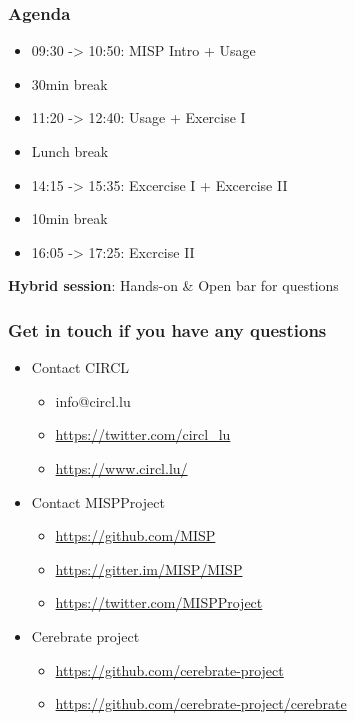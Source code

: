 
\begin{frame}
\titlepage
\end{frame}

\begin{frame}
\frametitle{Agenda}
    \begin{itemize}
        \item 09:30 -> 10:50: MISP Intro + Usage %
        \item 30min break
        \item 11:20 -> 12:40: Usage + Exercise I %
        \item Lunch break
        \item 14:15 -> 15:35: Excercise I + Excercise II %
        \item 10min break
        \item 16:05 -> 17:25: Excrcise II %
    \end{itemize}
    \vspace{0.5cm}
    \textbf{Hybrid session}: Hands-on \& Open bar for questions
\end{frame}

\begin{frame}
  \frametitle{Get in touch if you have any questions}
  \begin{itemize}
    \item Contact CIRCL
    \begin{itemize}
      \item info@circl.lu
      \item \url{https://twitter.com/circl_lu}
      \item \url{https://www.circl.lu/}
    \end{itemize}
    \item Contact MISPProject 
    \begin{itemize}
      \item \url{https://github.com/MISP}
      \item \url{https://gitter.im/MISP/MISP}
      \item \url{https://twitter.com/MISPProject}
    \end{itemize}
    \item Cerebrate project
    \begin{itemize}
      \item \url{https://github.com/cerebrate-project}
      \item \url{https://github.com/cerebrate-project/cerebrate}
    \end{itemize}
  \end{itemize}
\end{frame}
